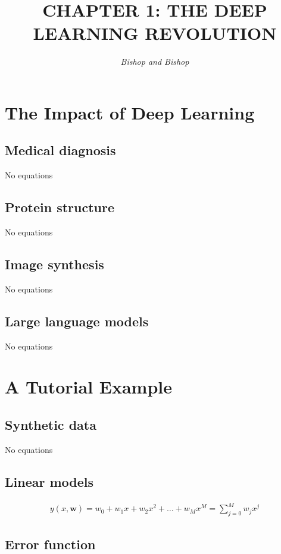 \documentclass{article}
\title{\LARGE\scshape\MakeUppercase{Chapter 1: The Deep Learning Revolution}}
\author{\textit{Bishop and Bishop}}
\date{}
\begin{document}
\maketitle

\section{The Impact of Deep Learning}

\subsection{Medical diagnosis}
No equations

\subsection{Protein structure}
No equations

\subsection{Image synthesis}
No equations

\subsection{Large language models}
No equations

\section{A Tutorial Example}

\subsection{Synthetic data}
No equations

\subsection{Linear models}

\begin{align*}
y(x, \mathbf{w})=w_{0}+w_{1} x+w_{2} x^{2}+\ldots+w_{M} x^{M} = \sum_{j=0}^{M} w_{j} x^{j}
\tag{1.1}
\end{align*}

\subsection{Error function}
\end{document}
